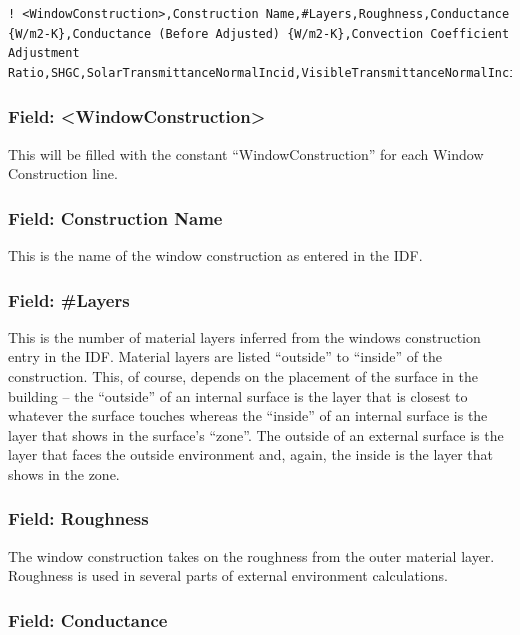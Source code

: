 \begin{lstlisting}
! <WindowConstruction>,Construction Name,#Layers,Roughness,Conductance {W/m2-K},Conductance (Before Adjusted) {W/m2-K},Convection Coefficient Adjustment Ratio,SHGC,SolarTransmittanceNormalIncid,VisibleTransmittanceNormalIncid
\end{lstlisting}

\subsubsection{Field: \textless{}WindowConstruction\textgreater{}}\label{field-windowconstruction}

This will be filled with the constant ``WindowConstruction'' for each Window Construction line.

\subsubsection{Field: Construction Name}\label{field-construction-name-1}

This is the name of the window construction as entered in the IDF.

\subsubsection{Field: \#Layers}\label{field-layers-1}

This is the number of material layers inferred from the windows construction entry in the IDF. Material layers are listed ``outside'' to ``inside'' of the construction. This, of course, depends on the placement of the surface in the building -- the ``outside'' of an internal surface is the layer that is closest to whatever the surface touches whereas the ``inside'' of an internal surface is the layer that shows in the surface's ``zone''. The outside of an external surface is the layer that faces the outside environment and, again, the inside is the layer that shows in the zone.

\subsubsection{Field: Roughness}\label{field-roughness-1}

The window construction takes on the roughness from the outer material layer. Roughness is used in several parts of external environment calculations.

\subsubsection{Field: Conductance}\label{field-conductance}

